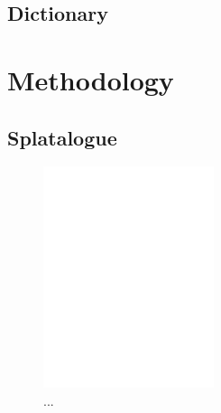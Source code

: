 \documentclass[twocolumn, draft]{emulateapj}
\begin{document}
\subsection{Dictionary}

\section{Methodology}
\label{sec:methodology}

\subsection{Splatalogue}

\begin{figure}[ht]
	\centering
	\includegraphics[width=5cm]{figs/fig1.pdf}
	\caption{...}
	\label{fig:fig1}
\end{figure}
\end{document}
